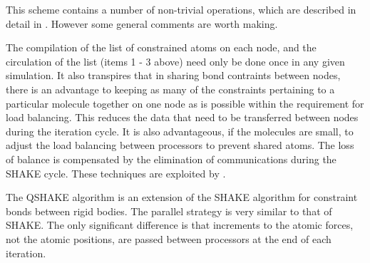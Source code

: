 This scheme contains a number of non-trivial operations, which are
described in detail in \cite{smith-93b}. However some general comments
are worth making.

The compilation of the list of constrained atoms on each node, and the
circulation of the list (items 1 - 3 above) need only be done once in
any given simulation. It also transpires that in sharing bond
contraints between nodes, there is an advantage to keeping as many of
the constraints pertaining to a particular molecule together on one
node as is possible within the requirement for load balancing. This
reduces the data that need to be transferred between nodes during the
iteration cycle. It is also advantageous, if the molecules are small,
to adjust the load balancing between processors to prevent shared
atoms. The loss of balance is compensated by the elimination of
communications during the SHAKE cycle. These 
techniques are exploited by \D{}.

The QSHAKE algorithm is an extension of the SHAKE algorithm for 
constraint bonds between rigid bodies. The parallel strategy is 
very similar to that of SHAKE. The only significant difference is that increments
to the atomic forces, not the atomic positions, are passed between
processors at the end of each iteration.
